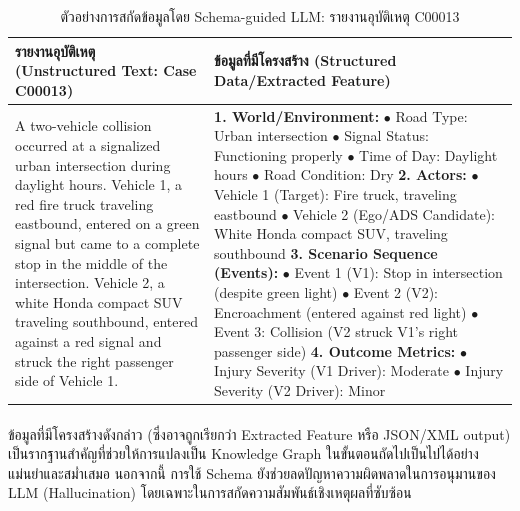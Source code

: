 \begin{table}[htbp]
\centering
\caption{ตัวอย่างการสกัดข้อมูลโดย Schema-guided LLM: รายงานอุบัติเหตุ C00013}
\label{tab:sgllm_example}
\begin{tabularx}{\textwidth}{|p{}|X|}
\hline
\rowcolor{gray!20} รายงานอุบัติเหตุ (Unstructured Text: Case C00013) & ข้อมูลที่มีโครงสร้าง (Structured Data/Extracted Feature) \\
\hline
A two-vehicle collision occurred at a signalized urban intersection during daylight hours. Vehicle 1, a red fire truck traveling eastbound, entered on a green signal but came to a complete stop in the middle of the intersection. Vehicle 2, a white Honda compact SUV traveling southbound, entered against a red signal and struck the right passenger side of Vehicle 1. & \textbf{1. World/Environment:} \newline
\quad $\bullet$ Road Type: Urban intersection \newline
\quad $\bullet$ Signal Status: Functioning properly \newline
\quad $\bullet$ Time of Day: Daylight hours \newline
\quad $\bullet$ Road Condition: Dry \newline
\textbf{2. Actors:} \newline
\quad $\bullet$ Vehicle 1 (Target): Fire truck, traveling eastbound \newline
\quad $\bullet$ Vehicle 2 (Ego/ADS Candidate): White Honda compact SUV, traveling southbound \newline
\textbf{3. Scenario Sequence (Events):} \newline
\quad $\bullet$ Event 1 (V1): Stop in intersection (despite green light) \newline
\quad $\bullet$ Event 2 (V2): Encroachment (entered against red light) \newline
\quad $\bullet$ Event 3: Collision (V2 struck V1's right passenger side) \newline
\textbf{4. Outcome Metrics:} \newline
\quad $\bullet$ Injury Severity (V1 Driver): Moderate \newline
\quad $\bullet$ Injury Severity (V2 Driver): Minor \\
\hline
\end{tabularx}
\end{table}

\paragraph{}
ข้อมูลที่มีโครงสร้างดังกล่าว (ซึ่งอาจถูกเรียกว่า Extracted Feature หรือ JSON/XML output) เป็นรากฐานสำคัญที่ช่วยให้การแปลงเป็น Knowledge Graph ในขั้นตอนถัดไปเป็นไปได้อย่างแม่นยำและสม่ำเสมอ นอกจากนี้ การใช้ Schema ยังช่วยลดปัญหาความผิดพลาดในการอนุมานของ LLM (Hallucination) โดยเฉพาะในการสกัดความสัมพันธ์เชิงเหตุผลที่ซับซ้อน

